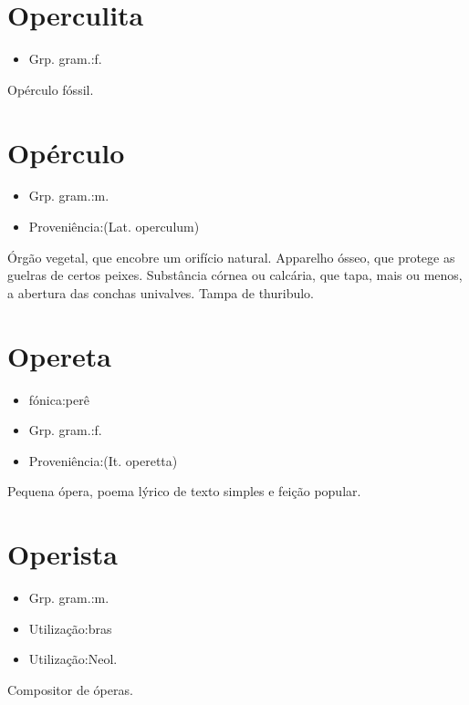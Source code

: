 \section{Operculita}
\begin{itemize}
\item {Grp. gram.:f.}
\end{itemize}
Opérculo fóssil.
\section{Opérculo}
\begin{itemize}
\item {Grp. gram.:m.}
\end{itemize}
\begin{itemize}
\item {Proveniência:(Lat. \textunderscore operculum\textunderscore )}
\end{itemize}
Órgão vegetal, que encobre um orifício natural.
Apparelho ósseo, que protege as guelras de certos peixes.
Substância córnea ou calcária, que tapa, mais ou menos, a abertura das conchas univalves.
Tampa de thuribulo.
\section{Opereta}
\begin{itemize}
\item {fónica:perê}
\end{itemize}
\begin{itemize}
\item {Grp. gram.:f.}
\end{itemize}
\begin{itemize}
\item {Proveniência:(It. \textunderscore operetta\textunderscore )}
\end{itemize}
Pequena ópera, poema lýrico de texto simples e feição popular.
\section{Operista}
\begin{itemize}
\item {Grp. gram.:m.}
\end{itemize}
\begin{itemize}
\item {Utilização:bras}
\end{itemize}
\begin{itemize}
\item {Utilização:Neol.}
\end{itemize}
Compositor de óperas.
